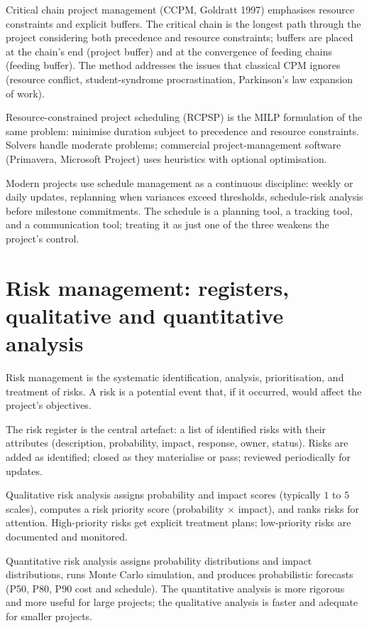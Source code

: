 Critical chain project management (CCPM, Goldratt 1997) emphasises resource constraints and explicit buffers. The critical chain is the longest path through the project considering both precedence and resource constraints; buffers are placed at the chain's end (project buffer) and at the convergence of feeding chains (feeding buffer). The method addresses the issues that classical CPM ignores (resource conflict, student-syndrome procrastination, Parkinson's law expansion of work).

Resource-constrained project scheduling (RCPSP) is the MILP formulation of the same problem: minimise duration subject to precedence and resource constraints. Solvers handle moderate problems; commercial project-management software (Primavera, Microsoft Project) uses heuristics with optional optimisation.

Modern projects use schedule management as a continuous discipline: weekly or daily updates, replanning when variances exceed thresholds, schedule-risk analysis before milestone commitments. The schedule is a planning tool, a tracking tool, and a communication tool; treating it as just one of the three weakens the project's control.

\section{Risk management: registers, qualitative and quantitative analysis}

Risk management is the systematic identification, analysis, prioritisation, and treatment of risks. A risk is a potential event that, if it occurred, would affect the project's objectives.

The risk register is the central artefact: a list of identified risks with their attributes (description, probability, impact, response, owner, status). Risks are added as identified; closed as they materialise or pass; reviewed periodically for updates.

Qualitative risk analysis assigns probability and impact scores (typically $1$ to $5$ scales), computes a risk priority score (probability $\times$ impact), and ranks risks for attention. High-priority risks get explicit treatment plans; low-priority risks are documented and monitored.

Quantitative risk analysis assigns probability distributions and impact distributions, runs Monte Carlo simulation, and produces probabilistic forecasts (P50, P80, P90 cost and schedule). The quantitative analysis is more rigorous and more useful for large projects; the qualitative analysis is faster and adequate for smaller projects.

